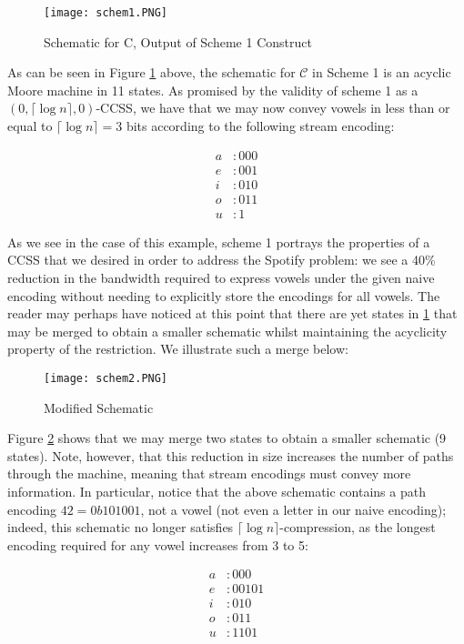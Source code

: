 \documentclass{article}
\theoremstyle{definition}
\begin{document}
\begin{figure}[H]
    \centering
    \texttt{[image: schem1.PNG]}
    \caption{Schematic for C, Output of Scheme 1 Construct}
    \label{fig1}
\end{figure}

As can be seen in Figure \ref{fig1} above, the schematic for $\mathcal{C}$ in Scheme 
1 is an acyclic Moore machine in 11 states.  As promised by the validity of 
scheme 1 as a $(0,\lceil \log{n} \rceil, 0)$-CCSS, we have that we may now convey 
vowels in less than or equal to $\lceil \log{n} \rceil = 3$ bits according to the 
following stream encoding:

\begin{align*}
a &: 000 \\
e &: 001 \\
i &: 010 \\
o &: 011 \\
u &: 1
\end{align*}

\noindent As we see in the case of this example, scheme 1 portrays the properties 
of a CCSS that we desired in order to address the Spotify problem: we see a 40\% 
reduction in the bandwidth required to express vowels under the given naive encoding
without needing to explicitly store the encodings for all vowels.
\newline\newline
The reader may perhaps have noticed at this point that there are yet states in 
\ref{fig1} that may be merged to obtain a smaller schematic whilst maintaining 
the acyclicity property of the restriction.  We illustrate such a merge below:

\begin{figure}[H]
    \centering
    \texttt{[image: schem2.PNG]}
    \caption{Modified Schematic}
    \label{fig2}
\end{figure}

\noindent Figure \ref{fig2} shows that we may merge two states to obtain 
a smaller schematic (9 states).  Note, however, that this reduction in size 
increases the number of paths through the machine, meaning that stream encodings
must convey more information.  In particular, notice that the above schematic 
contains a path encoding $42=0b101001$, not a vowel (not even a letter 
in our naive encoding); indeed, this schematic 
no longer satisfies $\lceil \log{n} \rceil$-compression, as the longest encoding 
required for any vowel increases from 3 to 5:

\begin{align*}
a &: 000 \\
e &: 00101 \\
i &: 010 \\
o &: 011 \\
u &: 1101
\end{align*}
\end{document}
